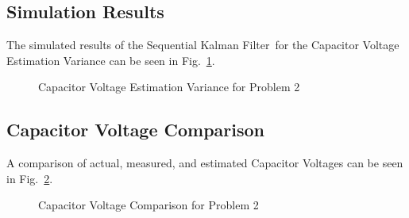 \documentclass[]{article}
\newcommand{\KF}{Kalman Filter}
\renewcommand{\figurename}{Fig.}
\begin{document}
	\subsection{Simulation Results}
		The simulated results of the Sequential \KF \ for the Capacitor Voltage Estimation Variance can be seen in \figurename \ \ref{fig:pblm2estvar}.
		
		\begin{figure}[p]
			\centering
			\caption{Capacitor Voltage Estimation Variance for Problem 2}
			\label{fig:pblm2estvar}
		\end{figure}
	
	\subsection{Capacitor Voltage Comparison}
		A comparison of actual, measured, and estimated Capacitor Voltages can be seen in \figurename \ \ref{fig:pblm2comparison}.
		\begin{figure}[p]
			\centering
			\caption{Capacitor Voltage Comparison for Problem 2}
			\label{fig:pblm2comparison}
		\end{figure}
		
\end{document}
